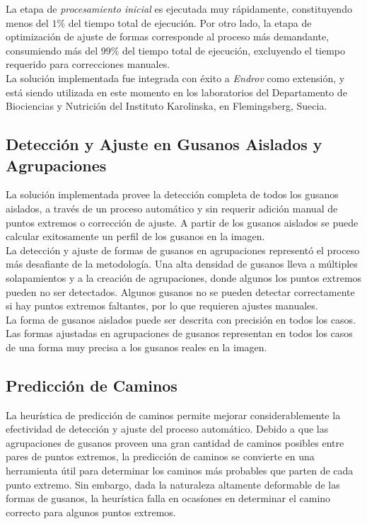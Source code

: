 La etapa de \emph{procesamiento inicial} es ejecutada muy r\'apidamente,
constituyendo menos del $1\%$ del tiempo total de ejecuci\'on. Por otro
lado, la etapa de optimizaci\'on de ajuste de formas corresponde al
proceso m\'as demandante, consumiendo m\'as del $99\%$ del tiempo total de
ejecuci\'on, excluyendo el tiempo requerido para correcciones manuales.\\

La soluci\'on implementada fue integrada con \'exito a \emph{Endrov} como
extensi\'on, y est\'a siendo utilizada en este momento en los laboratorios
del Departamento de Biociencias y Nutrici\'on del Instituto Karolinska, en
Flemingsberg, Suecia.



\subsection*{Detecci\'on y Ajuste en Gusanos Aislados y Agrupaciones}

La soluci\'on implementada provee la detecci\'on completa de todos
los gusanos aislados, a trav\'es de un proceso autom\'atico y sin 
requerir adici\'on manual de puntos extremos o correcci\'on
de ajuste. A partir de los gusanos aislados se puede calcular 
exitosamente un perfil de los gusanos en la imagen.\\

La detecci\'on y ajuste de formas de gusanos en agrupaciones represent\'o
el proceso m\'as desafiante de la metodolog\'ia. Una alta densidad
de gusanos lleva a m\'ultiples solapamientos y a la creaci\'on
de agrupaciones, donde algunos los puntos extremos pueden no
ser detectados. Algunos gusanos no se pueden detectar correctamente
si hay puntos extremos faltantes, por lo que requieren ajustes manuales.\\

La forma de gusanos aislados puede ser descrita con precisi\'on en todos
los casos. Las formas ajustadas en agrupaciones de gusanos representan
en todos los casos de una forma muy precisa a los gusanos reales en la imagen.

\subsection*{Predicci\'on de Caminos}

La heur\'istica de predicci\'on de caminos permite mejorar considerablemente
la efectividad de detecci\'on y ajuste del proceso autom\'atico. Debido
a que las agrupaciones de gusanos proveen una gran cantidad de caminos
posibles entre pares de puntos extremos, la predicci\'on de caminos se 
convierte en una herramienta \'util para determinar los caminos m\'as
probables que parten de cada punto extremo. Sin embargo, dada la naturaleza
altamente deformable de las formas de gusanos, la heur\'istica falla
en ocas\'iones en determinar el camino correcto para algunos puntos
extremos.

